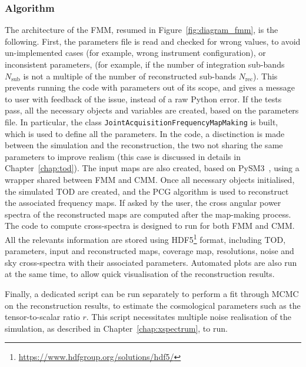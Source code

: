 \documentclass[../../thesis.tex]{subfiles}
\begin{document}
\subsubsection{Algorithm}

The architecture of the FMM, resumed in Figure~\ref{fig:diagram_fmm}, is the following. First, the parameters file is read and checked for wrong values, to avoid un-implemented cases (for example, wrong instrument configuration), or inconsistent parameters, (for example, if the number of integration sub-bands $N_{\text{sub}}$ is not a multiple of the number of reconstructed sub-bands $N_{\text{rec}}$). This prevents running the code with parameters out of its scope, and gives a message to user with feedback of the issue, instead of a raw Python error.
If the tests pass, all the necessary objects and variables are created, based on the parameters file. In particular, the class \texttt{JointAcquisitionFrequencyMapMaking} is built, which is used to define all the parameters. In the code, a disctinction is made between the simulation and the reconstruction, the two not sharing the same parameters to improve realism (this case is discussed in details in Chapter~\ref{chap:tod}). The input maps are also created, based on PySM3~\cite{PySM}, using a wrapper shared between FMM and CMM.
Once all necessary objects initialised, the simulated TOD are created, and the PCG algorithm is used to reconstruct the associated frequency maps. If asked by the user, the cross angular power spectra of the reconstructed maps are computed after the map-making process. The code to compute cross-spectra is designed to run for both FMM and CMM.
All the relevants information are stored using HDF5\footnote{\url{https://www.hdfgroup.org/solutions/hdf5/}} format, including TOD, parameters, input and reconstructed maps, coverage map, resolutions, noise and sky cross-spectra with their associated parameters. 
Automated plots are also run at the same time, to allow quick visualisation of the reconstruction results.

Finally, a dedicated script can be run separately to perform a fit through MCMC on the reconstruction results, to estimate the cosmological parameters such as the tensor-to-scalar ratio $r$. This script necessitates multiple noise realisation  of the simulation, as described in Chapter~\ref{chap:xspectrum}, to run.
\end{document}
